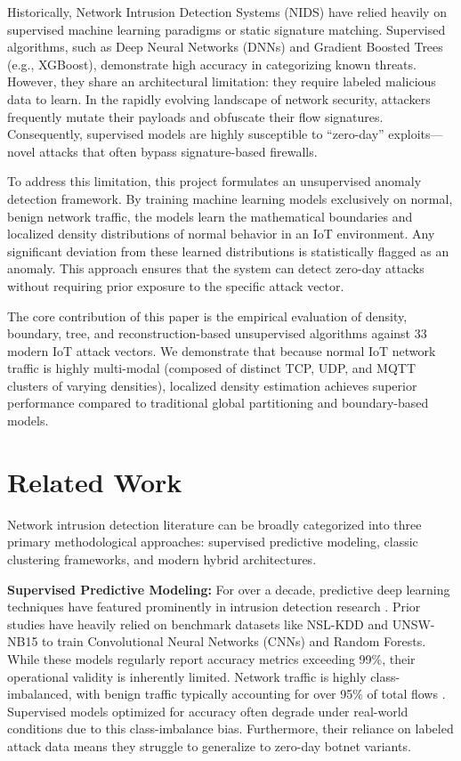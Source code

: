 \documentclass{article}
\begin{document}
Historically, Network Intrusion Detection Systems (NIDS) have relied heavily on supervised machine learning paradigms or static signature matching. Supervised algorithms, such as Deep Neural Networks (DNNs) and Gradient Boosted Trees (e.g., XGBoost), demonstrate high accuracy in categorizing known threats. However, they share an architectural limitation: they require labeled malicious data to learn. In the rapidly evolving landscape of network security, attackers frequently mutate their payloads and obfuscate their flow signatures. Consequently, supervised models are highly susceptible to ``zero-day'' exploits---novel attacks that often bypass signature-based firewalls.

To address this limitation, this project formulates an unsupervised anomaly detection framework. By training machine learning models exclusively on normal, benign network traffic, the models learn the mathematical boundaries and localized density distributions of normal behavior in an IoT environment. Any significant deviation from these learned distributions is statistically flagged as an anomaly. This approach ensures that the system can detect zero-day attacks without requiring prior exposure to the specific attack vector. 

The core contribution of this paper is the empirical evaluation of density, boundary, tree, and reconstruction-based unsupervised algorithms against 33 modern IoT attack vectors. We demonstrate that because normal IoT network traffic is highly multi-modal (composed of distinct TCP, UDP, and MQTT clusters of varying densities), localized density estimation achieves superior performance compared to traditional global partitioning and boundary-based models.

\section{Related Work}

Network intrusion detection literature can be broadly categorized into three primary methodological approaches: supervised predictive modeling, classic clustering frameworks, and modern hybrid architectures.

\textbf{Supervised Predictive Modeling:} For over a decade, predictive deep learning techniques have featured prominently in intrusion detection research \cite{buczak2016}. Prior studies have heavily relied on benchmark datasets like NSL-KDD and UNSW-NB15 \cite{buczak2016} to train Convolutional Neural Networks (CNNs) and Random Forests. While these models regularly report accuracy metrics exceeding 99\%, their operational validity is inherently limited. Network traffic is highly class-imbalanced, with benign traffic typically accounting for over 95\% of total flows \cite{imbalance_ids}. Supervised models optimized for accuracy often degrade under real-world conditions due to this class-imbalance bias. Furthermore, their reliance on labeled attack data means they struggle to generalize to zero-day botnet variants.
\end{document}
